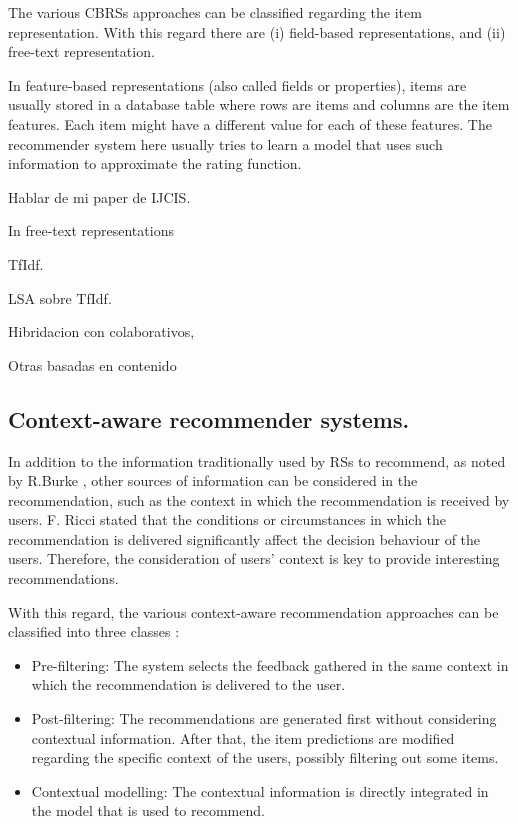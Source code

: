 \documentclass[preprint]{elsarticle}
\begin{document}
\begin{spacing}{2}
The various CBRSs approaches can be classified regarding the item representation. With this regard there are (i) field-based representations, and (ii) free-text representation. 

In feature-based representations (also called fields or properties), items are usually stored in a database table where rows are items and columns are the item features. Each item might have a different value for each of these features. The recommender system here usually tries to learn a model that uses such information to approximate the rating function.

Hablar de mi paper de IJCIS.


In free-text representations

TfIdf.

LSA sobre TfIdf.

Hibridacion con colaborativos, \cite{Symeonidis2007} 

Otras basadas en contenido


\subsection{Context-aware recommender systems.}

In addition to the information traditionally used by RSs to recommend, as noted by R.Burke \cite{Burke2002}, other sources of information can be considered in the recommendation, such as the context in which the recommendation is received by users. F. Ricci \cite{Ricci2012contextualizing} stated that the conditions or circumstances in which the recommendation is delivered significantly affect the decision behaviour of the users. Therefore, the consideration of users' context is key to provide interesting recommendations.

With this regard, the various context-aware recommendation approaches can be classified into three classes \cite{Adomavicius2011}:
\begin{itemize}
	\item Pre-filtering: The system selects the feedback gathered in the same context in which the recommendation is delivered to the user.
	\item Post-filtering: The recommendations are generated first without considering contextual information. After that, the item predictions are modified regarding the specific context of the users, possibly filtering out some items.
	\item Contextual modelling: The contextual information is directly integrated in the model that is used to recommend.
\end{itemize}


\end{spacing}
\end{document}
